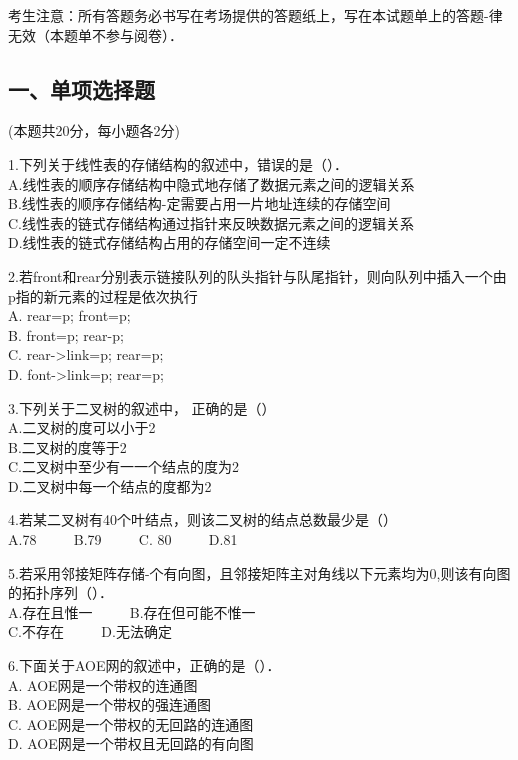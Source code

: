 
考生注意：所有答题务必书写在考场提供的答题纸上，写在本试题单上的答题-律无效（本题单不参与阅卷）．

\subsection{一、单项选择题}
(本题共20分，每小题各2分)

1.下列关于线性表的存储结构的叙述中，错误的是（）． \\
A.线性表的顺序存储结构中隐式地存储了数据元素之间的逻辑关系 \\
B.线性表的顺序存储结构-定需要占用一片地址连续的存储空间 \\
C.线性表的链式存储结构通过指针来反映数据元素之间的逻辑关系 \\
D.线性表的链式存储结构占用的存储空间一定不连续

2.若front和rear分别表示链接队列的队头指针与队尾指针，则向队列中插入一个由p指的新元素的过程是依次执行 \\
A. rear=p; front=p; \\
B. front=p; rear-p; \\
C. rear->link=p; rear=p; \\
D. font->link=p; rear=p;

3.下列关于二叉树的叙述中， 正确的是（） \\
A.二叉树的度可以小于2 \\
B.二叉树的度等于2 \\
C.二叉树中至少有一一个结点的度为2 \\
D.二叉树中每一个结点的度都为2

4.若某二叉树有40个叶结点，则该二叉树的结点总数最少是（） \\
A.78 $\qquad$ B.79 $\qquad$ C. 80 $\qquad$ D.81

5.若采用邻接矩阵存储-个有向图，且邻接矩阵主对角线以下元素均为0,则该有向图的拓扑序列（）． \\
A.存在且惟一 $\qquad$ B.存在但可能不惟一 \\
C.不存在 $\qquad$ D.无法确定

6.下面关于AOE网的叙述中，正确的是（）． \\
A. AOE网是一个带权的连通图 \\
B. AOE网是一个带权的强连通图 \\
C. AOE网是一个带权的无回路的连通图 \\
D. AOE网是一个带权且无回路的有向图

